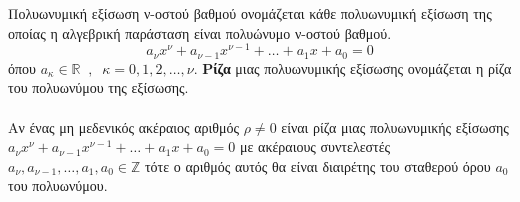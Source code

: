 \documentclass[twoside,nofonts,internet,shmeiwseis]{thewria}
\begin{document}
\orismoi
{}
Πολυωνυμική εξίσωση ν-οστού βαθμού ονομάζεται κάθε πολυωνυμική εξίσωση της οποίας η αλγεβρική παράσταση είναι πολυώνυμο ν-οστού βαθμού.
\[ a_\nu x^\nu+a_{\nu-1}x^{\nu-1}+\ldots+a_1x+a_0=0 \]
όπου $ a_\kappa\in\mathbb{R}\;\;,\;\;\kappa=0,1,2,\ldots,\nu $. \textbf{Ρίζα} μιας πολυωνυμικής εξίσωσης ονομάζεται η ρίζα του πολυωνύμου της εξίσωσης.\\\\
\thewrhmata
{}
Αν ένας μη μεδενικός ακέραιος αριθμός $ \rho\neq0 $ είναι ρίζα μιας πολυωνυμικής εξίσωσης $ a_\nu x^\nu+a_{\nu-1}x^{\nu-1}+\ldots+a_1x+a_0=0 $ με ακέραιους συντελεστές $ a_\nu ,a_{\nu-1},\ldots,a_1,a_0\in\mathbb{Z} $ τότε ο αριθμός αυτός θα είναι διαιρέτης του σταθερού όρου $ a_0 $ του πολυωνύμου.
\end{document}
